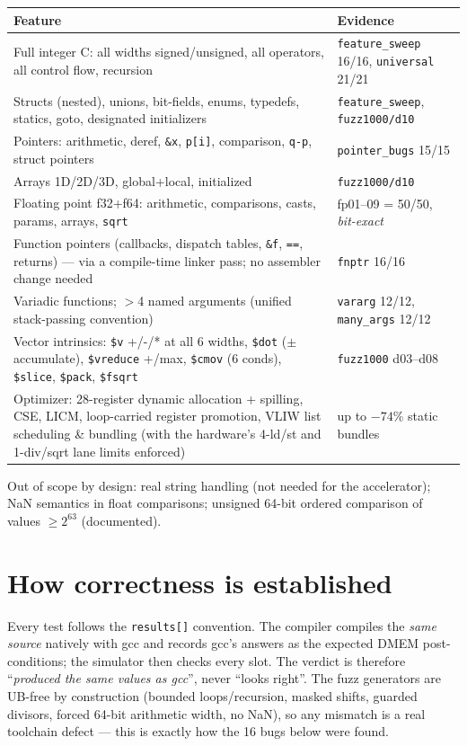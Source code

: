 \documentclass[11pt,a4paper]{report}
\begin{document}
\begin{longtable}{@{}p{8.2cm}p{5.6cm}@{}}
\toprule
Feature & Evidence \\
\midrule
Full integer C: all widths signed/unsigned, all operators, all control flow,
recursion & \texttt{feature\_sweep} 16/16, \texttt{universal} 21/21 \\
Structs (nested), unions, bit-fields, enums, typedefs, statics, goto,
designated initializers & \texttt{feature\_sweep}, \texttt{fuzz1000/d10} \\
Pointers: arithmetic, deref, \texttt{\&x}, \texttt{p[i]}, comparison,
\texttt{q-p}, struct pointers & \texttt{pointer\_bugs} 15/15 \\
Arrays 1D/2D/3D, global+local, initialized & \texttt{fuzz1000/d10} \\
Floating point f32+f64: arithmetic, comparisons, casts, params, arrays,
\texttt{sqrt} & fp01--09 = 50/50, \emph{bit-exact} \\
Function pointers (callbacks, dispatch tables, \texttt{\&f}, \texttt{==},
returns) --- via a compile-time linker pass; no assembler change needed &
\texttt{fnptr} 16/16 \\
Variadic functions; $>$4 named arguments (unified stack-passing convention)
& \texttt{vararg} 12/12, \texttt{many\_args} 12/12 \\
Vector intrinsics: \texttt{\$v} +/-/* at all 6 widths, \texttt{\$dot}
($\pm$accumulate), \texttt{\$vreduce} +/max, \texttt{\$cmov} (6 conds),
\texttt{\$slice}, \texttt{\$pack}, \texttt{\$fsqrt} & \texttt{fuzz1000}
d03--d08 \\
Optimizer: 28-register dynamic allocation + spilling, CSE, LICM,
loop-carried register promotion, VLIW list scheduling \& bundling (with the
hardware's 4-ld/st and 1-div/sqrt lane limits enforced) & up to $-74\%$
static bundles \\
\bottomrule
\end{longtable}

Out of scope by design: real string handling (not needed for the
accelerator); NaN semantics in float comparisons; unsigned 64-bit ordered
comparison of values $\ge 2^{63}$ (documented).

\section{How correctness is established}

Every test follows the \texttt{results[]} convention. The compiler compiles
the \emph{same source} natively with gcc and records gcc's answers as the
expected DMEM post-conditions; the simulator then checks every slot. The
verdict is therefore ``\emph{produced the same values as gcc}'', never
``looks right''. The fuzz generators are UB-free by construction (bounded
loops/recursion, masked shifts, guarded divisors, forced 64-bit arithmetic
width, no NaN), so any mismatch is a real toolchain defect --- this is
exactly how the 16 bugs below were found.
\end{document}
